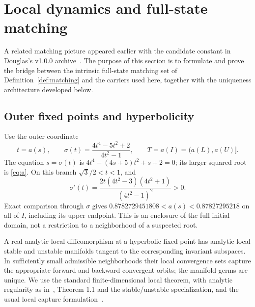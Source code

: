\section{Local dynamics and full-state matching}\label{sec:matching}
A related matching picture appeared earlier with the candidate constant in
Douglas's v1.0.0 archive~\cite{Douglas2026Zenodo}. The purpose of this section
is to formulate and prove the bridge between the intrinsic full-state matching
set of Definition~\ref{def:matching} and the carriers used here, together with
the uniqueness architecture developed below.

\subsection{Outer fixed points and hyperbolicity}
Use the outer coordinate
\begin{equation}\label{eq:sigma}
 t=a(s),\qquad \sigma(t)=\frac{4t^4-5t^2+2}{4t^2-1},\qquad
 T=a(I)=(a(L),a(U)].
\end{equation}
The equation \(s=\sigma(t)\) is
\(4t^4-(4s+5)t^2+s+2=0\); its larger squared root is \eqref{eq:a}.
On this branch \(\sqrt3/2<t<1\), and
\begin{equation}\label{eq:sigmaprime}
 \sigma'(t)=\frac{2t(4t^2-3)(4t^2+1)}{(4t^2-1)^2}>0.
\end{equation}
Exact comparison through \(\sigma\) gives
\(0.8782729451808<a(s)<0.87827295218\) on all of \(I\), including its
upper endpoint. This is an enclosure of the full initial domain, not a
restriction to a neighborhood of a suspected root.

\begin{premise}\label{prem:stable}
A real-analytic local diffeomorphism at a hyperbolic fixed point has analytic
local stable and unstable manifolds tangent to the corresponding invariant
subspaces. In sufficiently small admissible neighborhoods their local
convergence sets capture the appropriate forward and backward convergent
orbits; the manifold germs are unique. We use the standard finite-dimensional
local theorem, with analytic regularity as in~\cite{CabreFontichLlave2003},
Theorem 1.1 and the stable/unstable specialization, and the usual local
capture formulation~\cite{Shub1987}.
\end{premise}

